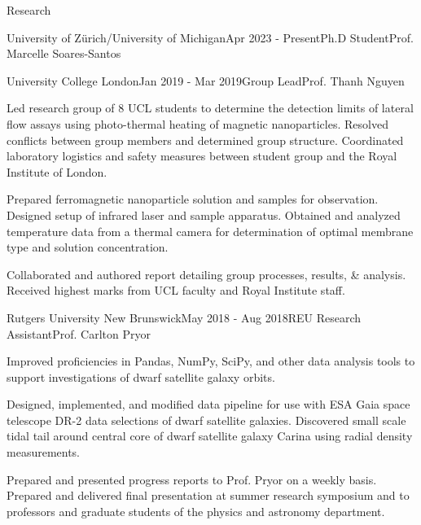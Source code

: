 \documentclass{resume} %
\begin{document}
\begin{rSection}{Research}
\begin{rSubsection}{University of Zürich/University of Michigan}{Apr 2023 - Present}{Ph.D Student}{Prof. Marcelle Soares-Santos}
\begin{rSubsection}{University College London}{Jan 2019 - Mar 2019}{Group Lead}{Prof. Thanh Nguyen}
\item Led research group of 8 UCL students to determine the detection limits of lateral flow assays using photo-thermal heating of magnetic nanoparticles. Resolved conflicts between group members and determined group structure. Coordinated laboratory logistics and safety measures between student group and the Royal Institute of London.
\item Prepared ferromagnetic nanoparticle solution and samples for observation. Designed setup of infrared laser and sample apparatus. Obtained and analyzed temperature data from a thermal camera for determination of optimal membrane type and solution concentration.
\item Collaborated and authored report detailing group processes, results, \& analysis. Received highest marks from UCL faculty and Royal Institute staff.
\end{rSubsection}

\begin{rSubsection}{Rutgers University New Brunswick}{May 2018 - Aug 2018}{REU Research Assistant}{Prof. Carlton Pryor}
\item Improved proficiencies in Pandas, NumPy, SciPy, and other data analysis tools to support investigations of dwarf satellite galaxy orbits.
\item Designed, implemented, and modified data pipeline for use with ESA Gaia space telescope DR-2 data selections of dwarf satellite galaxies. Discovered small scale tidal tail around central core of dwarf satellite galaxy Carina using radial density measurements.
\item Prepared and presented progress reports to Prof. Pryor on a weekly basis. Prepared and delivered final presentation at summer research symposium and to professors and graduate students of the physics and astronomy department.
\end{rSubsection}



\end{rSubsection}
\end{rSection}
\end{document}
